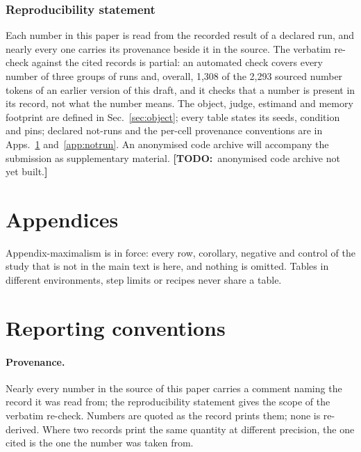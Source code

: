 \documentclass{article} %
\newcommand{\TODO}[1]{{\color{orange}\textbf{[TODO:}~#1\textbf{]}}}
\begin{document}
\subsubsection*{Reproducibility statement}
Each number in this paper is read from the recorded result of a declared run, and nearly every
one carries its provenance beside it in the source. The verbatim re-check against the cited records
is partial: an automated check covers every number of three groups of runs and, overall, 1,308 of %
the 2,293 sourced number tokens of an earlier version of this draft, and it checks that a number is %
present in its record, not what the number means. The object, judge, estimand and memory footprint are
defined in Sec.~\ref{sec:object}; every table states its seeds, condition and pins; declared
not-runs and the per-cell provenance conventions are in
Apps.~\ref{app:conventions} and~\ref{app:notrun}. An anonymised code archive will accompany the
submission as supplementary material. \TODO{anonymised code archive not yet built.}


\clearpage
\appendix
\section*{Appendices}
Appendix-maximalism is in force: every row, corollary, negative and control of the study that
is not in the main text is here, and nothing is omitted. Tables in different environments,
step limits or recipes never share a table.

\section{Reporting conventions}
\label{app:conventions}

\paragraph{Provenance.} Nearly every number in the source of this paper carries a comment naming
the record it was read from; the reproducibility statement gives the scope of the verbatim re-check. Numbers are quoted as the record prints them; none is re-derived.
Where two records print the same quantity at different precision, the one cited is the one the
number was taken from.
\end{document}

